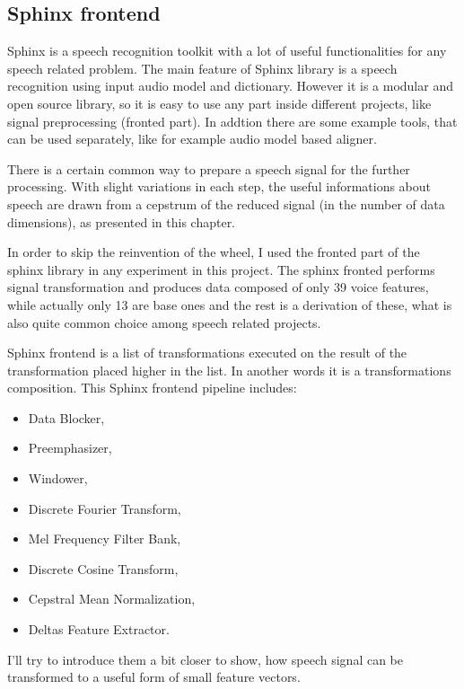 \documentclass[12pt,a4paper,english]{article}
\begin{document}
\newpage
\subsection{Sphinx frontend}


Sphinx is a speech recognition toolkit with a lot of useful functionalities for any speech related problem.  \newline
The main feature of Sphinx library is a speech recognition using input audio model and dictionary. However it is a modular and open source library,
so it is easy to use any part inside different projects, like signal preprocessing (fronted part). In addtion there are some example tools, that can be used separately, like
for example audio model based aligner. \newline

There is a certain common way to prepare a speech signal for the further processing. With slight variations in each step, the useful informations about speech are drawn from a cepstrum of the reduced signal (in the number of data dimensions), as presented in this chapter. \newline

In order to skip the reinvention of the wheel, I used the fronted part of the sphinx library in any experiment in this project.
The sphinx fronted performs signal transformation and produces data composed of only 39 voice features,
while actually only 13 are base ones and the rest is a derivation of these, what is also quite common choice among speech related projects. \newline

Sphinx frontend is a list of transformations executed on the result of the transformation placed higher in the list.
In another words it is a transformations composition. \newline
\newline
This Sphinx frontend pipeline includes: \newline
\begin{itemize}
	\item Data Blocker,
	\item Preemphasizer,
	\item Windower,
	\item Discrete Fourier Transform,
	\item Mel Frequency Filter Bank,
	\item Discrete Cosine Transform,
	\item Cepstral Mean Normalization,
	\item Deltas Feature Extractor.
\end{itemize}
I'll try to introduce them a bit closer to show, how speech signal can be transformed to a useful form of small feature vectors.
\end{document}
